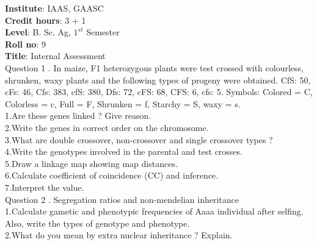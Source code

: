 \documentclass[12pt]{article}\usepackage[]{graphicx}\usepackage[]{color}
\begin{document}
{            \textbf{Institute}: IAAS, GAASC \\}\textbf{Credit hours}: 3 + 1 \\\textbf{Level}: B. Sc. Ag, $1^{st}$ Semester \\\textbf{Roll no}: 9 \\\textbf{Title}: Internal Assessment \\[1cm]Question 1 . In maize, F1 heterozygous plants were test crossed with colourless, shrunken, waxy plants and the following types of progeny were obtained. CfS: 50, cFs: 46, Cfs: 383, cfS: 380, Dfs: 72, cFS: 68, CFS: 6, cfs: 5. Symbols: Colored = C, Colorless = c, Full = F, Shrunken = f, Starchy = S, waxy = s. \\\hspace{0.5cm}1.Are these genes linked ? Give reason.\\\hspace{0.5cm}2.Write the genes in correct order on the chromosome.\\\hspace{0.5cm}3.What are double crossover, non-crossover and single crossover types ?\\\hspace{0.5cm}4.Write the genotypes involved in the parental and test crosses.\\\hspace{0.5cm}5.Draw a linkage map showing map distances.\\\hspace{0.5cm}6.Calculate coefficient of coincidence (CC) and inference.\\\hspace{0.5cm}7.Interpret the value.\\Question 2 . Segregation ratios and non-mendelian inheritance \\\hspace{0.5cm}1.Calculate gametic and phenotypic frequencies of Aaaa individual after selfing. Also, write the types of genotype and phenotype.\\\hspace{0.5cm}2.What do you mean by extra nuclear inheritance ? Explain.\\
\end{document}
